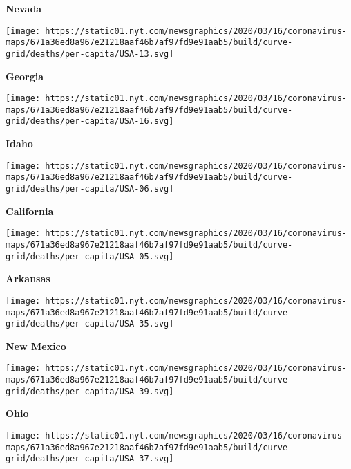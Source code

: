 \textbf{Nevada}

\href{https://www.nytimes.com/interactive/2020/us/georgia-coronavirus-cases.html}{}

\texttt{[image: https://static01.nyt.com/newsgraphics/2020/03/16/coronavirus-maps/671a36ed8a967e21218aaf46b7af97fd9e91aab5/build/curve-grid/deaths/per-capita/USA-13.svg]}

\textbf{Georgia}

\href{https://www.nytimes.com/interactive/2020/us/idaho-coronavirus-cases.html}{}

\texttt{[image: https://static01.nyt.com/newsgraphics/2020/03/16/coronavirus-maps/671a36ed8a967e21218aaf46b7af97fd9e91aab5/build/curve-grid/deaths/per-capita/USA-16.svg]}

\textbf{Idaho}

\href{https://www.nytimes.com/interactive/2020/us/california-coronavirus-cases.html}{}

\texttt{[image: https://static01.nyt.com/newsgraphics/2020/03/16/coronavirus-maps/671a36ed8a967e21218aaf46b7af97fd9e91aab5/build/curve-grid/deaths/per-capita/USA-06.svg]}

\textbf{California}

\href{https://www.nytimes.com/interactive/2020/us/arkansas-coronavirus-cases.html}{}

\texttt{[image: https://static01.nyt.com/newsgraphics/2020/03/16/coronavirus-maps/671a36ed8a967e21218aaf46b7af97fd9e91aab5/build/curve-grid/deaths/per-capita/USA-05.svg]}

\textbf{Arkansas}

\href{https://www.nytimes.com/interactive/2020/us/new-mexico-coronavirus-cases.html}{}

\texttt{[image: https://static01.nyt.com/newsgraphics/2020/03/16/coronavirus-maps/671a36ed8a967e21218aaf46b7af97fd9e91aab5/build/curve-grid/deaths/per-capita/USA-35.svg]}

\textbf{New Mexico}

\href{https://www.nytimes.com/interactive/2020/us/ohio-coronavirus-cases.html}{}

\texttt{[image: https://static01.nyt.com/newsgraphics/2020/03/16/coronavirus-maps/671a36ed8a967e21218aaf46b7af97fd9e91aab5/build/curve-grid/deaths/per-capita/USA-39.svg]}

\textbf{Ohio}

\href{https://www.nytimes.com/interactive/2020/us/north-carolina-coronavirus-cases.html}{}

\texttt{[image: https://static01.nyt.com/newsgraphics/2020/03/16/coronavirus-maps/671a36ed8a967e21218aaf46b7af97fd9e91aab5/build/curve-grid/deaths/per-capita/USA-37.svg]}

